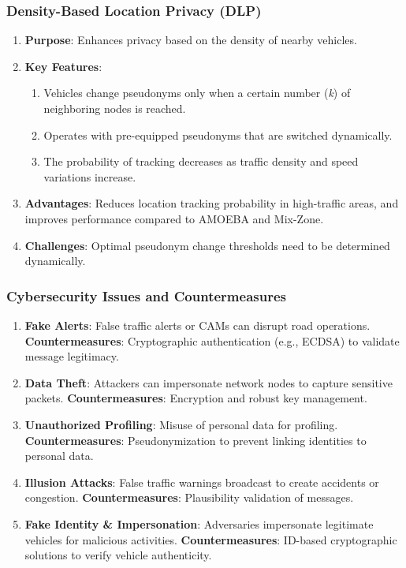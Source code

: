 \subsubsection{Density-Based Location Privacy (DLP)}
\begin{enumerate}
    \item \textbf{Purpose}: Enhances privacy based on the density of nearby vehicles.
    \item \textbf{Key Features}:
    \begin{enumerate}
        \item Vehicles change pseudonyms only when a certain number (\emph{k}) of neighboring nodes is reached.
        \item Operates with pre-equipped pseudonyms that are switched dynamically.
        \item The probability of tracking decreases as traffic density and speed variations increase.
    \end{enumerate}
    \item \textbf{Advantages}: Reduces location tracking probability in high-traffic areas, and improves performance compared to AMOEBA and Mix-Zone.
    \item \textbf{Challenges}: Optimal pseudonym change thresholds need to be determined dynamically.
\end{enumerate}

\subsubsection{Cybersecurity Issues and Countermeasures}
\begin{enumerate}
    \item \textbf{Fake Alerts}: False traffic alerts or CAMs can disrupt road operations. \textbf{Countermeasures}: Cryptographic authentication (e.g., ECDSA) to validate message legitimacy.
    \item \textbf{Data Theft}: Attackers can impersonate network nodes to capture sensitive packets. \textbf{Countermeasures}: Encryption and robust key management.
    \item \textbf{Unauthorized Profiling}: Misuse of personal data for profiling. \textbf{Countermeasures}: Pseudonymization to prevent linking identities to personal data.
    \item \textbf{Illusion Attacks}: False traffic warnings broadcast to create accidents or congestion. \textbf{Countermeasures}: Plausibility validation of messages.
    \item \textbf{Fake Identity \& Impersonation}: Adversaries impersonate legitimate vehicles for malicious activities. \textbf{Countermeasures}: ID-based cryptographic solutions to verify vehicle authenticity.
\end{enumerate}


